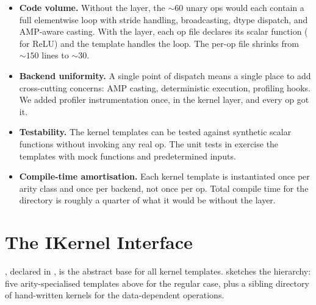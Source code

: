 \begin{itemize}
  \item \textbf{Code volume.} Without the layer, the \(\sim 60\)
    unary ops would each contain a full elementwise loop with
    stride handling, broadcasting, dtype dispatch, and AMP-aware
    casting. With the layer, each op file declares its scalar
    function ( for
    ReLU) and the template handles the loop. The per-op file
    shrinks from \(\sim 150\) lines to \(\sim 30\).
  \item \textbf{Backend uniformity.} A single point of dispatch
    means a single place to add cross-cutting concerns: AMP
    casting, deterministic execution, profiling hooks. We added
    profiler instrumentation once, in the kernel layer, and every
    op got it.
  \item \textbf{Testability.} The kernel templates can be tested
    against synthetic scalar functions without invoking any real
    op. The unit tests in  exercise the
    templates with mock functions and predetermined inputs.
  \item \textbf{Compile-time amortisation.} Each kernel template
    is instantiated once per arity class and once per backend, not
    once per op. Total compile time for the  directory
    is roughly a quarter of what it would be without the layer.
\end{itemize}

\section{The IKernel Interface}
\label{sec:kernel_abstraction:ikernel}

, declared in , is
the abstract base for all kernel templates.
 sketches the hierarchy:
five arity-specialised templates above  for the
regular case, plus a sibling  directory of
hand-written kernels for the data-dependent operations.

